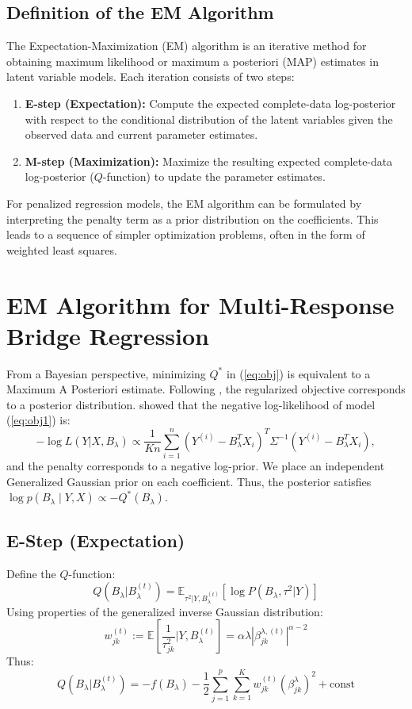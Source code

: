 \documentclass[twoside]{article}
\begin{document}
\subsection{Definition of the EM Algorithm}
The Expectation-Maximization (EM) algorithm is an iterative method for obtaining maximum likelihood or maximum a posteriori (MAP) estimates in latent variable models. Each iteration consists of two steps:
\begin{enumerate}
	\item \textbf{E-step (Expectation):} Compute the expected complete-data log-posterior with respect to the conditional distribution of the latent variables given the observed data and current parameter estimates.
	\item \textbf{M-step (Maximization):} Maximize the resulting expected complete-data log-posterior (\(Q\)-function) to update the parameter estimates.
\end{enumerate}
For penalized regression models, the EM algorithm can be formulated by interpreting the penalty term as a prior distribution on the coefficients. This leads to a sequence of simpler optimization problems, often in the form of weighted least squares.



\section{EM Algorithm for Multi-Response Bridge Regression}
From a Bayesian perspective, minimizing \(Q^*\) in (\ref{eq:obj}) is equivalent to a Maximum A Posteriori estimate. Following \cite{lindley1971}, the regularized objective corresponds to a posterior distribution. \cite{ghatari2024} showed that the negative log-likelihood of model (\ref{eq:obj1}) is:
\[
-\log L(Y|X,B_\lambda) \propto \frac{1}{Kn}\sum_{i=1}^n (Y^{(i)} - B_\lambda^T X_i)^T \Sigma^{-1} (Y^{(i)} - B_\lambda^T X_i),
\]
and the penalty corresponds to a negative log-prior. We place an independent Generalized Gaussian prior on each coefficient. 
Thus, the posterior satisfies \( \log p(B_\lambda \mid Y,X) \propto -Q^*(B_\lambda)\).
\subsection*{E-Step (Expectation)}
Define the \(Q\)-function:
$$ Q(B_\lambda | B_\lambda^{(t)}) = \mathbb{E}_{\tau^2 | Y, B_\lambda^{(t)}} \left[ \log P(B_\lambda, \tau^2 | Y) \right] $$
Using properties of the generalized inverse Gaussian distribution:
$$ w_{jk}^{(t)} := \mathbb{E}\left[ \frac{1}{\tau_{jk}^2} \Big| Y, B_\lambda^{(t)} \right] = \alpha \lambda |\beta_{jk}^{\lambda, (t)}|^{\alpha-2} $$
Thus:
$$ Q(B_\lambda | B_\lambda^{(t)}) = -f(B_\lambda) - \frac{1}{2} \sum_{j=1}^p \sum_{k=1}^K w_{jk}^{(t)} (\beta_{jk}^\lambda)^2 + \text{const} $$
\end{document}
